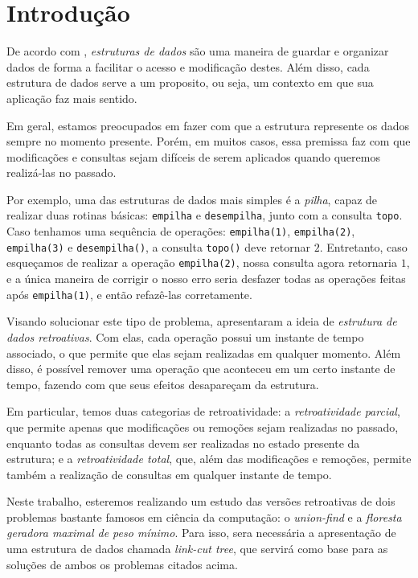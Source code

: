 
\chapter{Introdução}
\label{cap:introducao}

De acordo com \citet{10.5555/1614191}, \emph{estruturas de dados} são uma maneira de guardar e organizar dados de forma a facilitar o acesso e modificação destes. Além disso, cada estrutura de dados serve a um proposito, ou seja, um contexto em que sua aplicação faz mais sentido.

Em geral, estamos preocupados em fazer com que a estrutura represente os dados sempre no momento presente. Porém, em muitos casos, essa premissa faz com que modificações e consultas sejam difíceis de serem aplicados quando queremos realizá-las no passado.

Por exemplo, uma das estruturas de dados mais simples é a \emph{pilha}, capaz de realizar duas rotinas básicas: \texttt{empilha} e \texttt{desempilha}, junto com a consulta \texttt{topo}. Caso tenhamos uma sequência de operações: \texttt{empilha(1)}, \texttt{empilha(2)}, \texttt{empilha(3)} e \texttt{desempilha()}, a consulta \texttt{topo()} deve retornar $2$. Entretanto, caso esqueçamos de realizar a operação \texttt{empilha(2)}, nossa consulta agora retornaria $1$, e a única maneira de corrigir o nosso erro seria desfazer todas as operações feitas após \texttt{empilha(1)}, e então refazê-las corretamente.

Visando solucionar este tipo de problema, \citet{10.1145/1240233.1240236} apresentaram a ideia de \emph{estrutura de dados retroativas}. Com elas, cada operação possui um instante de tempo associado, o que permite que elas sejam realizadas em qualquer momento. Além disso, é possível remover uma operação que aconteceu em um certo instante de tempo, fazendo com que seus efeitos desapareçam da estrutura.

Em particular, temos duas categorias de retroatividade: a \emph{retroatividade parcial}, que permite apenas que modificações ou remoções sejam realizadas no passado, enquanto todas as consultas devem ser realizadas no estado presente da estrutura; e a \emph{retroatividade total}, que, além das modificações e remoções, permite também a realização de consultas em qualquer instante de tempo.

Neste trabalho, esteremos realizando um estudo das versões retroativas de dois problemas bastante famosos em ciência da computação: o \emph{union-find} e a \emph{floresta geradora maximal de peso mínimo}. Para isso, sera necessária a apresentação de uma estrutura de dados chamada \emph{link-cut tree}, que servirá como base para as soluções de ambos os problemas citados acima.

